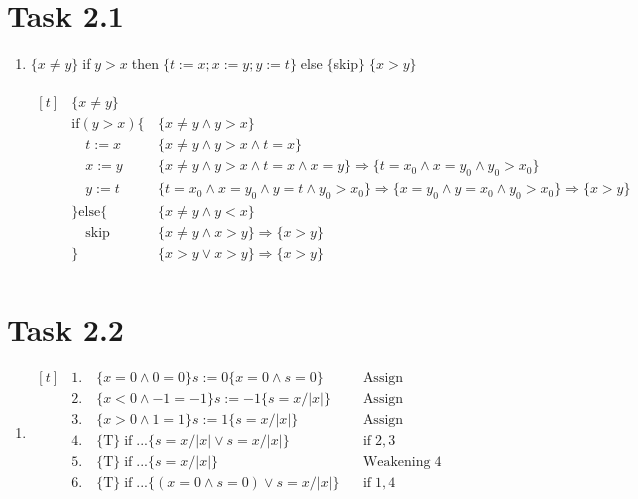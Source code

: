 \documentclass{article}
\newcommand{\answer}{\item[]} %
\begin{document}
	\section{Task 2.1}
		\begin{enumerate}[label = {(\alph*)}]
			
			\answer $\{x \neq y\}\; $if$\; y > x \; $then$ \; \{t := x; x := y; y := t\} \; $else$ \; \{$skip$\} \; \{x > y\}$ \\ \\
			$\begin{aligned}[t]
				&\{x \neq y\} \qquad & \\
				&\text{if}(y > x)\{ &\{x \neq y \land y > x\} \\
				&\quad t:= x &\{x \neq y \land y > x \land t = x\} \\
				&\quad x:= y &\{x \neq y \land y > x \land t = x \land x = y\} \Rightarrow \{t = x_{0} \land x = y_{0} \land y_{0} > x_{0}\} \\
				&\quad y:= t &\{t = x_{0} \land x = y_{0} \land y = t \land y_{0} > x_{0}\} \Rightarrow \{x = y_{0} \land y = x_{0} \land y_{0} > x_{0}\} \Rightarrow \{x > y\} \\
				&\} \text{else} \{ &\{x \neq y \land y < x\} \\
				&\quad \text{skip} &\{x \neq y \land x > y\} \Rightarrow \{x > y\}\\
				&\} &\{x > y \lor x > y\} \Rightarrow \{x > y\} \\
			\end{aligned}$
			
		\end{enumerate}
	
	\section{Task 2.2}
		\begin{enumerate}[label = {(\alph*)}]
			
			\answer
			$\begin{aligned}[t]
				&1.\quad \{x = 0 \land 0 = 0\} s := 0 \{x = 0 \land s = 0\} \qquad & \text{Assign} \\
				&2.\quad \{x < 0 \land -1 = -1\}s := -1 \{s = x/|x|\} & \text{Assign} \\
				&3.\quad \{x > 0 \land 1 = 1\}s := 1 \{s = x/|x|\} & \text{Assign} \\
				&4.\quad \{\text{T}\}\; \text{if} \; ... \{s = x/|x| \lor s = x/|x|\} & \text{if} \; 2,3 \\
				&5.\quad \{\text{T}\}\; \text{if} \; ... \{s = x/|x|\} & \text{Weakening} \; 4 \\
				&6.\quad \{\text{T}\}\; \text{if} \; ... \{(x = 0 \land s = 0) \lor s = x/|x|\} & \text{if} \; 1,4 \\
			\end{aligned}$
			
		\end{enumerate}
	
\end{document}
